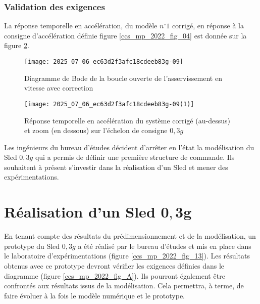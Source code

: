 \subsubsection{Validation des exigences \label{ccs_mp_2022_sec_3B4}}
La réponse temporelle en accélération, du modèle $n^{\circ} 1$ corrigé, en réponse à la consigne d'accélération définie figure \ref{ccs_mp_2022_fig_04} est donnée sur la figure \ref{ccs_mp_2022_fig_12}.





\begin{figure}[!h]
\centering
\texttt{[image: 2025\_07\_06\_ec63d2f3afc18cdeeb83g-09]}

\caption{\label{ccs_mp_2022_fig_11}Diagramme de Bode de la boucle ouverte de l'asservissement en vitesse avec correction}
\end{figure}

\begin{figure}[!h]
\centering
\texttt{[image: 2025\_07\_06\_ec63d2f3afc18cdeeb83g-09(1)]}

\caption{\label{ccs_mp_2022_fig_12}Réponse temporelle en accélération du système corrigé (au-dessus) et zoom (en dessous) sur l'échelon de consigne $0,3 g$}
\end{figure}

Les ingénieurs du bureau d'études décident d'arrêter en l'état la modélisation du Sled $0,3 g$ qui a permis de définir une première structure de commande. Ils souhaitent à présent s'investir dans la réalisation d'un Sled et mener des expérimentations.
\section{Réalisation d'un Sled $\mathbf{0 , 3 g}$ \label{ccs_mp_2022_sec_4}}
En tenant compte des résultats du prédimensionnement et de la modélisation, un prototype du Sled $0,3 g$ a été réalisé par le bureau d'études et mis en place dans le laboratoire d'expérimentations (figure \ref{ccs_mp_2022_fig_13}). Les résultats obtenus avec ce prototype devront vérifier les exigences définies dans le diagramme (figure \ref{ccs_mp_2022_fig_A}). Ils pourront également être confrontés aux résultats issus de la modélisation. Cela permettra, à terme, de faire évoluer à la fois le modèle numérique et le prototype.\\



